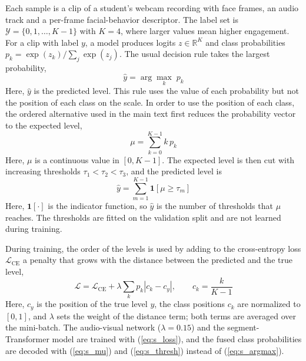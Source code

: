 \documentclass[pdflatex,sn-basic]{sn-jnl}
\begin{document}
Each sample is a clip of a student's webcam recording with face frames, an audio track and a per-frame facial-behavior descriptor. The label set is $\mathcal{Y} = \{0, 1, \ldots, K-1\}$ with $K = 4$, where larger values mean higher engagement. For a clip with label $y$, a model produces logits $z \in \mathbb{R}^{K}$ and class probabilities $p_k = \exp(z_k) / \sum_{j} \exp(z_j)$. The usual decision rule takes the largest probability,
\begin{equation}
\hat{y} = \arg\max_{k} \; p_k \label{eq:s_argmax}
\end{equation}
Here, $\hat{y}$ is the predicted level. This rule uses the value of each probability but not the position of each class on the scale. In order to use the position of each class, the ordered alternative used in the main text first reduces the probability vector to the expected level,
\begin{equation}
\mu = \sum_{k=0}^{K-1} k \, p_k \label{eq:s_mu}
\end{equation}
Here, $\mu$ is a continuous value in $[0, K-1]$. The expected level is then cut with increasing thresholds $\tau_1 < \tau_2 < \tau_3$, and the predicted level is
\begin{equation}
\hat{y} = \sum_{m=1}^{K-1} \mathbf{1}\!\left[\mu \geq \tau_m\right] \label{eq:s_thresh}
\end{equation}
Here, $\mathbf{1}[\cdot]$ is the indicator function, so $\hat{y}$ is the number of thresholds that $\mu$ reaches. The thresholds are fitted on the validation split and are not learned during training.

During training, the order of the levels is used by adding to the cross-entropy loss $\mathcal{L}_{\mathrm{CE}}$ a penalty that grows with the distance between the predicted and the true level,
\begin{equation}
\mathcal{L} = \mathcal{L}_{\mathrm{CE}} + \lambda \sum_{k} p_k \left| c_k - c_y \right|, \qquad c_k = \frac{k}{K-1} \label{eq:s_loss}
\end{equation}
Here, $c_y$ is the position of the true level $y$, the class positions $c_k$ are normalized to $[0,1]$, and $\lambda$ sets the weight of the distance term; both terms are averaged over the mini-batch. The audio-visual network ($\lambda = 0.15$) and the segment-Transformer model are trained with (\ref{eq:s_loss}), and the fused class probabilities are decoded with (\ref{eq:s_mu}) and (\ref{eq:s_thresh}) instead of (\ref{eq:s_argmax}).
\end{document}
